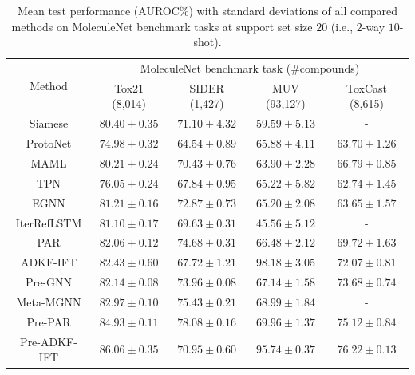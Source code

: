         \begin{table}
        \footnotesize
        \caption{Mean test performance (AUROC$\%$) with standard deviations of all compared methods on MoleculeNet benchmark tasks at support set size $20$ (i.e., $2$-way $10$-shot).}
        \label{tab:molnet-results}
            \centering
            \setlength\extrarowheight{-3pt}
            \begin{tabular}{ccccc}
                \toprule
                \multirow{2}[3]{*}{Method} & \multicolumn{4}{c}{MoleculeNet benchmark task (\#compounds)}\\
                \cmidrule(lr){2-5}
                & Tox21 (8,014) & SIDER (1,427) & MUV (93,127) & ToxCast (8,615) \\
                \midrule
                Siamese & $80.40\pm0.35$ & $71.10\pm4.32$ & $59.59\pm5.13$ & - \\
                ProtoNet & $74.98\pm0.32$ & $64.54\pm0.89$ & $65.88\pm4.11$ & $63.70\pm1.26$  \\
                MAML & $80.21\pm0.24$ & $70.43\pm0.76$ & $63.90\pm2.28$ & $66.79\pm0.85$ \\
                TPN & $76.05\pm0.24$ & $67.84\pm0.95$ & $65.22\pm5.82$ & $62.74\pm1.45$  \\
                EGNN & $81.21\pm0.16$ & $72.87\pm0.73$ & $65.20\pm2.08$ & $63.65\pm1.57$  \\
                IterRefLSTM & $81.10\pm0.17$ & $69.63\pm0.31$ & $45.56\pm5.12$ & -  \\
                PAR & $82.06\pm0.12$ & $\mathbf{74.68\pm0.31}$ & $66.48\pm2.12$ & $69.72\pm1.63$  \\
                ADKF-IFT & $\mathbf{82.43\pm0.60}$ & $67.72\pm1.21$ & $\mathbf{98.18\pm3.05}$ & $\mathbf{72.07\pm0.81}$  \\
                \midrule
                Pre-GNN & $82.14\pm0.08$ & $73.96\pm0.08$ & $67.14\pm1.58$ & $73.68\pm0.74$  \\
                Meta-MGNN & $82.97\pm0.10$ & $75.43\pm0.21$ & $68.99\pm1.84$ & -  \\
                Pre-PAR & $84.93\pm0.11$ & $\mathbf{78.08\pm0.16}$ & $69.96\pm1.37$ & $75.12\pm0.84$  \\ 
                Pre-ADKF-IFT & $\mathbf{86.06\pm0.35}$ & $70.95\pm0.60$ & $\mathbf{95.74\pm0.37}$ & $\mathbf{76.22\pm0.13}$  \\
                \bottomrule
            \end{tabular}
    \end{table}
    
